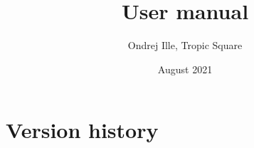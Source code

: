 \documentclass{tropic_design_spec}
\title{User manual}
\author{Ondrej Ille, Tropic Square}
\date{August 2021}
\begin{document}
\def \projectname {Tropic Square HW Simulation Scripting System}
\def \documentname {User manual}
\def \versionnumber {\iexec{git describe --tags --abbrev=0 HEAD}}

\maketitle


\section*{Version history}
\end{document}
